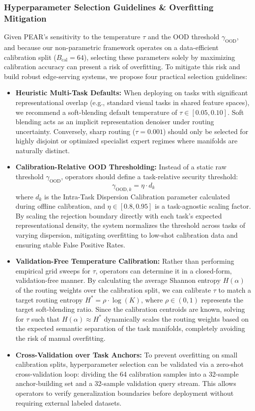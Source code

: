 \subsubsection{Hyperparameter Selection Guidelines \& Overfitting Mitigation}
Given PEAR's sensitivity to the temperature $\tau$ and the OOD threshold $\gamma_{\text{OOD}}$, and because our non-parametric framework operates on a data-efficient calibration split ($B_{\text{cal}} = 64$), selecting these parameters solely by maximizing calibration accuracy can present a risk of overfitting. To mitigate this risk and build robust edge-serving systems, we propose four practical selection guidelines:
\begin{itemize}
    \item \textbf{Heuristic Multi-Task Defaults:} When deploying on tasks with significant representational overlap (e.g., standard visual tasks in shared feature spaces), we recommend a soft-blending default temperature of $\tau \in [0.05, 0.10]$. Soft blending acts as an implicit representation denoiser under routing uncertainty. Conversely, sharp routing ($\tau = 0.001$) should only be selected for highly disjoint or optimized specialist expert regimes where manifolds are naturally distinct.
    \item \textbf{Calibration-Relative OOD Thresholding:} Instead of a static raw threshold $\gamma_{\text{OOD}}$, operators should define a task-relative security threshold:
    \begin{equation}
        \gamma_{\text{OOD}, k} = \eta \cdot d_k
    \end{equation}
    where $d_k$ is the Intra-Task Dispersion Calibration parameter calculated during offline calibration, and $\eta \in [0.8, 0.95]$ is a task-agnostic scaling factor. By scaling the rejection boundary directly with each task's expected representational density, the system normalizes the threshold across tasks of varying dispersion, mitigating overfitting to low-shot calibration data and ensuring stable False Positive Rates.
    \item \textbf{Validation-Free Temperature Calibration:} Rather than performing empirical grid sweeps for $\tau$, operators can determine it in a closed-form, validation-free manner. By calculating the average Shannon entropy $H(\alpha)$ of the routing weights over the calibration split, we can calibrate $\tau$ to match a target routing entropy $H^* = \rho \cdot \log(K)$, where $\rho \in (0, 1)$ represents the target soft-blending ratio. Since the calibration centroids are known, solving for $\tau$ such that $H(\alpha) \approx H^*$ dynamically scales the routing weights based on the expected semantic separation of the task manifolds, completely avoiding the risk of manual overfitting.
    \item \textbf{Cross-Validation over Task Anchors:} To prevent overfitting on small calibration splits, hyperparameter selection can be validated via a zero-shot cross-validation loop: dividing the 64 calibration samples into a 32-sample anchor-building set and a 32-sample validation query stream. This allows operators to verify generalization boundaries before deployment without requiring external labeled datasets.
\end{itemize}


